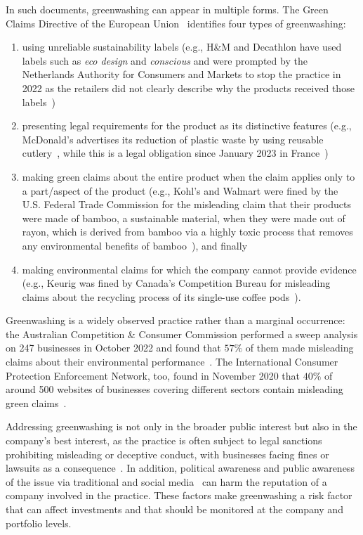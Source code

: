 In such documents,  greenwashing can appear in multiple forms. The Green Claims Directive of the European Union~\cite{eugreenclaims} identifies four types of greenwashing:
\begin{enumerate}
\item using unreliable sustainability labels (e.g., H\&M and Decathlon have used labels such as \textit{eco design} and \textit{conscious} and were prompted by the Netherlands Authority for Consumers and Markets to stop the practice in 2022 as the retailers did not clearly describe why the products received those labels~\cite{decathonhm})
\item presenting legal requirements for the product as its distinctive features (e.g., McDonald's advertises its reduction of plastic waste by using reusable cutlery~\cite{mcdonalds}, while this is a legal obligation since January 2023 in France~\cite{plasticfrance})
\item making green claims about the entire product when the claim applies only to a part/aspect of the product (e.g., Kohl's and Walmart were fined by the U.S. Federal Trade Commission for the misleading claim that their products were made of bamboo, a sustainable material, when they were made out of rayon, which is derived from bamboo via a highly toxic process that removes any environmental benefits of bamboo~\cite{bambooeco}), and finally
\item making environmental claims for which the company cannot provide evidence (e.g., Keurig was fined by Canada's Competition Bureau for misleading claims about the recycling process of its single-use coffee pods~\cite{keurigcoffee}).
\end{enumerate} 
Greenwashing is a widely observed practice rather than a marginal occurrence: the Australian Competition \& Consumer Commission performed a sweep analysis on 247 businesses in October 2022 and found that $57\%$ of them made misleading claims about their environmental performance~\cite{sweepaustralia}. The International Consumer Protection Enforcement Network, too, found in November 2020 that $40\%$ of around 500 websites of businesses covering different sectors contain misleading green claims~\cite{globalsweep}.

Addressing greenwashing is not only in the broader public interest but also in the company's best interest, as the practice is often subject to legal sanctions prohibiting misleading or deceptive conduct, with businesses facing fines or lawsuits as a consequence~\cite{litigatorsgreenwashing}. In addition, political awareness and public awareness of the issue via traditional and social media~\cite{bonpote} can harm the reputation of a company involved in the practice. These factors make greenwashing a risk factor that can affect investments and that should be monitored at the company and portfolio levels.

